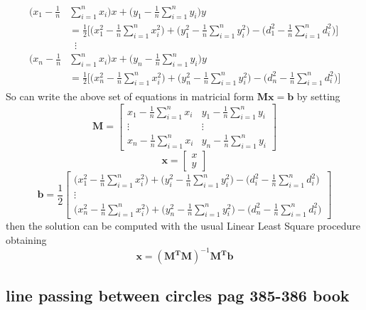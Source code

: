 \documentclass[12pt]{report}
\begin{document}
\begin{align}
\begin{split} 
    \bigg(x_1-\frac{1}{n}&\sum_{i=1}^nx_i\bigg)x+\bigg(y_1-\frac{1}{n}\sum_{i=1}^ny_i\bigg)y\\
    &=\frac{1}{2}\bigg[\bigg(x_1^2-\frac{1}{n}\sum_{i=1}^nx^2_i\bigg)+\bigg(y_1^2-\frac{1}{n}\sum_{i=1}^ny^2_i\bigg)-\bigg(d_1^2-\frac{1}{n}\sum_{i=1}^nd_i^2\bigg)\bigg]\\
&\;\;\vdots\\
    \bigg(x_n-\frac{1}{n}&\sum_{i=1}^nx_i\bigg)x+\bigg(y_n-\frac{1}{n}\sum_{i=1}^ny_i\bigg)y\\
    &=\frac{1}{2}\bigg[\bigg(x_n^2-\frac{1}{n}\sum_{i=1}^nx^2_i\bigg)+\bigg(y_n^2-\frac{1}{n}\sum_{i=1}^ny^2_i\bigg)-\bigg(d_n^2-\frac{1}{n}\sum_{i=1}^nd_i^2\bigg)\bigg]
\end{split}
\end{align}
So can write the above set of equations in matricial form $\mathbf{Mx}=\mathbf{b}$ by setting
$$
\mathbf{M}=\begin{bmatrix}
    x_1-\frac{1}{n}\sum_{i=1}^nx_i&y_1-\frac{1}{n}\sum_{i=1}^ny_i\\
    \vdots&\vdots\\
    x_n-\frac{1}{n}\sum_{i=1}^nx_i&y_n-\frac{1}{n}\sum_{i=1}^ny_i
\end{bmatrix}
$$
$$
\mathbf{x}=\begin{bmatrix}
    x\\
    y
\end{bmatrix}
$$
$$\mathbf{b}=\frac{1}{2}
\begin{bmatrix}
\bigg(x_1^2-\frac{1}{n}\sum_{i=1}^nx^2_i\bigg)+\bigg(y_i^2-\frac{1}{n}\sum_{i=1}^ny^2_i\bigg)-\bigg(d_i^2-\frac{1}{n}\sum_{i=1}^nd_i^2\bigg)\\
\vdots\\
\bigg(x_n^2-\frac{1}{n}\sum_{i=1}^nx^2_i\bigg)+\bigg(y_n^2-\frac{1}{n}\sum_{i=1}^ny^2_i\bigg)-\bigg(d_n^2-\frac{1}{n}\sum_{i=1}^nd_i^2\bigg)
\end{bmatrix}
$$
then the solution can be computed with the usual Linear Least Square procedure obtaining
\begin{equation}
    \mathbf{x}=(\mathbf{M^TM})^{-1}\mathbf{M^Tb}
\end{equation}




\clearpage
\subsection{line passing between circles pag 385-386 book}
\end{document}
